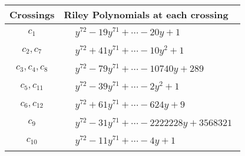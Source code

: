\documentclass[1p]{elsarticle_modified}
\theoremstyle{definition}
\begin{document}
\begin{tabular}{m{50pt}|m{274pt}}
Crossings & \hspace{64pt}Riley Polynomials at each crossing \\
\hline $$\begin{aligned}c_{1}\end{aligned}$$&$\begin{aligned}
&y^{72}-19 y^{71}+\cdots-20 y+1
\end{aligned}$\\
\hline $$\begin{aligned}c_{2},c_{7}\end{aligned}$$&$\begin{aligned}
&y^{72}+41 y^{71}+\cdots-10 y^2+1
\end{aligned}$\\
\hline $$\begin{aligned}c_{3},c_{4},c_{8}\end{aligned}$$&$\begin{aligned}
&y^{72}-79 y^{71}+\cdots-10740 y+289
\end{aligned}$\\
\hline $$\begin{aligned}c_{5},c_{11}\end{aligned}$$&$\begin{aligned}
&y^{72}-39 y^{71}+\cdots-2 y^2+1
\end{aligned}$\\
\hline $$\begin{aligned}c_{6},c_{12}\end{aligned}$$&$\begin{aligned}
&y^{72}+61 y^{71}+\cdots-624 y+9
\end{aligned}$\\
\hline $$\begin{aligned}c_{9}\end{aligned}$$&$\begin{aligned}
&y^{72}-31 y^{71}+\cdots-2222228 y+3568321
\end{aligned}$\\
\hline $$\begin{aligned}c_{10}\end{aligned}$$&$\begin{aligned}
&y^{72}-11 y^{71}+\cdots-4 y+1
\end{aligned}$\\
\hline
\end{tabular}
\vskip 2pc
\end{document}
